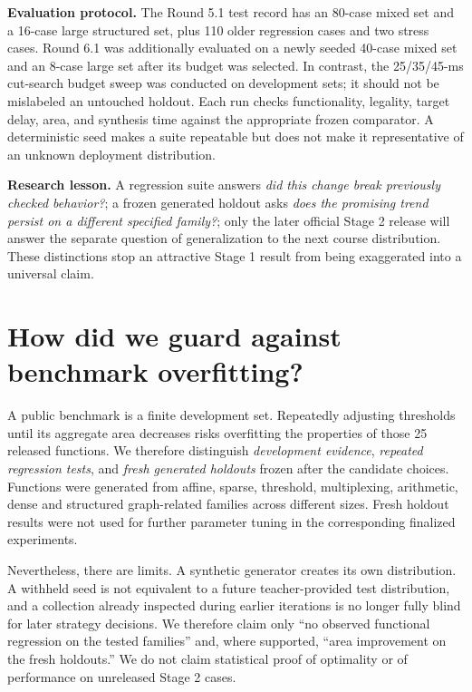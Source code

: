 \documentclass[a4paper,10pt]{article}
\theoremstyle{definition}
\theoremstyle{remark}
\begin{document}
\textbf{Evaluation protocol.} The Round 5.1 test record has an 80-case mixed set and a 16-case large structured set, plus 110 older regression cases and two stress cases. Round 6.1 was additionally evaluated on a newly seeded 40-case mixed set and an 8-case large set after its budget was selected. In contrast, the 25/35/45-ms cut-search budget sweep was conducted on development sets; it should not be mislabeled an untouched holdout. Each run checks functionality, legality, target delay, area, and synthesis time against the appropriate frozen comparator. A deterministic seed makes a suite repeatable but does not make it representative of an unknown deployment distribution.

\textbf{Research lesson.} A regression suite answers \emph{did this change break previously checked behavior?}; a frozen generated holdout asks \emph{does the promising trend persist on a different specified family?}; only the later official Stage 2 release will answer the separate question of generalization to the next course distribution. These distinctions stop an attractive Stage 1 result from being exaggerated into a universal claim.

\section{How did we guard against benchmark overfitting?}
A public benchmark is a finite development set. Repeatedly adjusting thresholds until its aggregate area decreases risks overfitting the properties of those 25 released functions. We therefore distinguish \emph{development evidence}, \emph{repeated regression tests}, and \emph{fresh generated holdouts} frozen after the candidate choices. Functions were generated from affine, sparse, threshold, multiplexing, arithmetic, dense and structured graph-related families across different sizes. Fresh holdout results were not used for further parameter tuning in the corresponding finalized experiments.

Nevertheless, there are limits. A synthetic generator creates its own distribution. A withheld seed is not equivalent to a future teacher-provided test distribution, and a collection already inspected during earlier iterations is no longer fully blind for later strategy decisions. We therefore claim only ``no observed functional regression on the tested families'' and, where supported, ``area improvement on the fresh holdouts.'' We do not claim statistical proof of optimality or of performance on unreleased Stage 2 cases.
\end{document}
